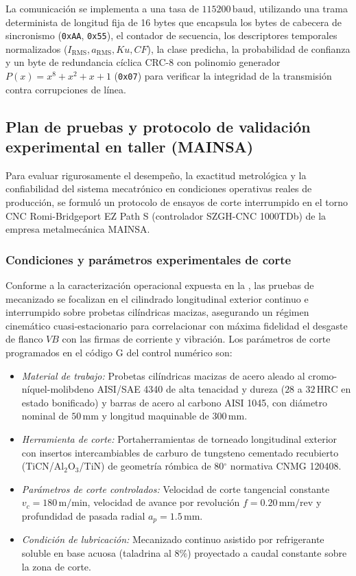La comunicación se implementa a una tasa de $115200\,\text{baud}$, utilizando una trama determinista de longitud fija de 16 bytes que encapsula los bytes de cabecera de sincronismo (\texttt{0xAA}, \texttt{0x55}), el contador de secuencia, los descriptores temporales normalizados ($I_{\text{RMS}}, a_{\text{RMS}}, Ku, CF$), la clase predicha, la probabilidad de confianza y un byte de redundancia cíclica CRC-8 con polinomio generador $P(x) = x^8 + x^2 + x + 1$ (\texttt{0x07}) para verificar la integridad de la transmisión contra corrupciones de línea.

\subsection{Plan de pruebas y protocolo de validación experimental en taller (MAINSA)}
\label{subsec:protocolo_experimental_taller}

Para evaluar rigurosamente el desempeño, la exactitud metrológica y la confiabilidad del sistema mecatrónico en condiciones operativas reales de producción, se formuló un protocolo de ensayos de corte interrumpido en el torno CNC Romi-Bridgeport EZ Path S (controlador SZGH-CNC 1000TDb) de la empresa metalmecánica MAINSA.

\subsubsection{Condiciones y parámetros experimentales de corte}
Conforme a la caracterización operacional expuesta en la , las pruebas de mecanizado se focalizan en el cilindrado longitudinal exterior continuo e interrumpido sobre probetas cilíndricas macizas, asegurando un régimen cinemático cuasi-estacionario para correlacionar con máxima fidelidad el desgaste de flanco $VB$ con las firmas de corriente y vibración. Los parámetros de corte programados en el código G del control numérico son:

\begin{itemize}
    \item \textit{Material de trabajo:} Probetas cilíndricas macizas de acero aleado al cromo-níquel-molibdeno AISI/SAE 4340 de alta tenacidad y dureza ($28$ a $32\,\text{HRC}$ en estado bonificado) y barras de acero al carbono AISI 1045, con diámetro nominal de $50\,\text{mm}$ y longitud maquinable de $300\,\text{mm}$.
    \item \textit{Herramienta de corte:} Portaherramientas de torneado longitudinal exterior con insertos intercambiables de carburo de tungsteno cementado recubierto (TiCN/Al$_2$O$_3$/TiN) de geometría rómbica de 80$^\circ$ normativa CNMG 120408.
    \item \textit{Parámetros de corte controlados:} Velocidad de corte tangencial constante $v_c = 180\,\text{m/min}$, velocidad de avance por revolución $f = 0.20\,\text{mm/rev}$ y profundidad de pasada radial $a_p = 1.5\,\text{mm}$.
    \item \textit{Condición de lubricación:} Mecanizado continuo asistido por refrigerante soluble en base acuosa (taladrina al $8\%$) proyectado a caudal constante sobre la zona de corte.
\end{itemize}


